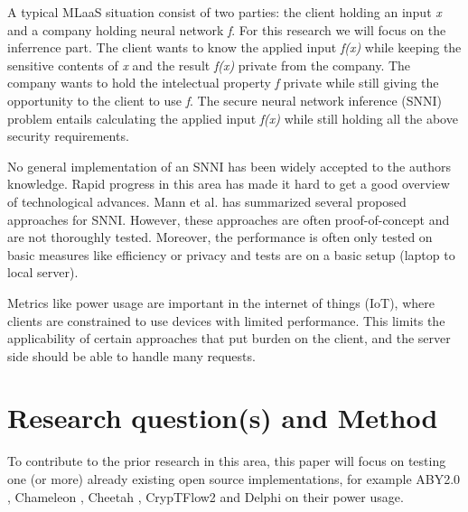 \documentclass{uva-inf-article}
\begin{document}
A typical MLaaS situation consist of two parties: the client holding an input \textit{x} and a company holding neural network \textit{f}. For this research we will focus on the inferrence part. The client wants to know the applied input \textit{f(x)} while keeping the sensitive contents of \textit{x} and the result \textit{f(x)} private from the company. The company wants to hold the intelectual property \textit{f} private while still giving the opportunity to the client to use \textit{f}. The secure neural network inference (SNNI) problem entails calculating the applied input \textit{f(x)} while still holding all the above security requirements. 

No general implementation of an SNNI has been widely accepted to the authors knowledge. Rapid progress in this area has made it hard to get a good overview of technological advances. Mann et al.  has summarized several proposed approaches for SNNI. However, these approaches are often proof-of-concept and are not thoroughly tested. Moreover, the performance is often only tested on basic measures like efficiency or privacy and tests are on a basic setup (laptop to local server).

Metrics like power usage are important in the internet of things (IoT), where clients are constrained to use devices with limited performance. This limits the applicability of certain approaches that put burden on the client, and the server side should be able to handle many requests.  

\section{Research question(s) and Method}
To contribute to the prior research in this area, this paper will focus on testing one (or more) already existing open source implementations, for example ABY2.0 \parencite{ABY20}, Chameleon \parencite{Chameleon}, Cheetah \parencite{Cheetah}, CrypTFlow2 \parencite{CrypTFlow2} and Delphi \parencite{Delphi} on their power usage. 
\end{document}
